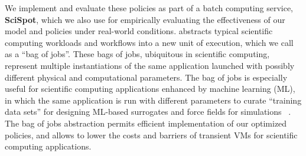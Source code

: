 We implement and evaluate these policies as part of a batch computing service, \textbf{SciSpot}, which we also use for empirically evaluating the effectiveness of our model and policies under real-world conditions. 
%
\sysname abstracts typical scientific computing workloads and workflows into a new unit of execution, which we call as a ``bag of jobs''. 
These bags of jobs, ubiquitous in scientific computing, represent multiple instantiations of the same application launched with possibly different physical and computational parameters.
The bag of jobs is especially useful for scientific computing applications enhanced by machine learning (ML), in which the same application is run with different parameters to curate ``training data sets'' for designing ML-based surrogates and force fields for simulations ~\cite{kadupitiya2019machine,kadupitiya2020machine2,moradzadeh2019molecular,fox2019learning,wang2019machine}.
%
The bag of jobs abstraction permits efficient implementation of our optimized policies, and allows \sysname to lower the costs and barriers of transient VMs for scientific computing applications.


